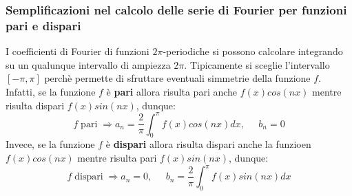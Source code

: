\subsubsection{Semplificazioni nel calcolo delle serie di Fourier per funzioni pari e dispari}
I coefficienti di Fourier di funzioni $2\pi$-periodiche si possono calcolare integrando su un qualunque intervallo di ampiezza $2\pi$. Tipicamente si sceglie l'intervallo $[-\pi, \pi]$ perchè permette di sfruttare eventuali simmetrie della funzione $f$.\newline
Infatti, se la funzione $f$ è \textbf{pari} allora risulta pari anche $f(x)cos(nx)$ mentre risulta dispari $f(x)sin(nx)$, dunque:
\[
    f \; \text{pari}\; \Rightarrow a_n = \frac{2}{\pi} \int_{0}^{\pi}f(x) cos(nx) dx , \;\;\;\;\;b_n = 0
\]
Invece, se la funzione $f$ è \textbf{dispari} allora risulta dispari anche la funzioen $f(x)cos(nx)$ mentre risulta pari $f(x) sin(nx)$, dunque:
\[
    f \; \text{dispari}\; \Rightarrow a_n = 0, \;\;\;\;\;b_n = \frac{2}{\pi} \int_{0}^{\pi} f(x) sin(nx)dx
\]
